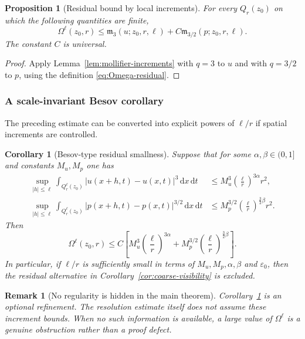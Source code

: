 \documentclass[11pt]{article}
\numberwithin{equation}{section}
\newtheorem{proposition}[theorem]{Proposition}
\newtheorem{corollary}[theorem]{Corollary}
\newtheorem{remark}[theorem]{Remark}
\newcommand{\eps}{\varepsilon}
\newcommand{\dxdt}{\,\mathrm dx\,\mathrm dt}
\begin{document}
\begin{proposition}[Residual bound by local increments]\label{prop:residual-increments}
For every $Q_r(z_0)$ on which the following quantities are finite,
\begin{equation}\label{eq:Omega-increment-bound}
\Omega^\ell(z_0,r)
\le
\mathfrak m_3(u;z_0,r,\ell)+C\mathfrak m_{3/2}(p;z_0,r,\ell).
\end{equation}
The constant $C$ is universal.
\end{proposition}

\begin{proof}
Apply Lemma~\ref{lem:mollifier-increments} with $q=3$ to $u$ and with $q=3/2$ to $p$, using the definition \eqref{eq:Omega-residual}.
\end{proof}

\subsubsection{A scale-invariant Besov corollary}

The preceding estimate can be converted into explicit powers of $\ell/r$ if spatial increments are controlled.

\begin{corollary}[Besov-type residual smallness]\label{cor:besov-residual}
Suppose that for some $\alpha,\beta\in(0,1]$ and constants $M_u,M_p$ one has
\begin{align}
\sup_{|h|\le\ell}\int_{Q_r^\ell(z_0)}|u(x+h,t)-u(x,t)|^3\dxdt
&\le M_u^3\left(\frac{\ell}{r}\right)^{3\alpha}r^2,
\label{eq:u-besov-assumption}\\
\sup_{|h|\le\ell}\int_{Q_r^\ell(z_0)}|p(x+h,t)-p(x,t)|^{3/2}\dxdt
&\le M_p^{3/2}\left(\frac{\ell}{r}\right)^{\frac32\beta}r^2.
\label{eq:p-besov-assumption}
\end{align}
Then
\begin{equation}\label{eq:besov-Omega-bound}
\Omega^\ell(z_0,r)
\le
C\left[M_u^3\left(\frac{\ell}{r}\right)^{3\alpha}
+M_p^{3/2}\left(\frac{\ell}{r}\right)^{\frac32\beta}\right].
\end{equation}
In particular, if $\ell/r$ is sufficiently small in terms of $M_u,M_p,\alpha,\beta$ and $\eps_0$, then the residual alternative in Corollary~\ref{cor:coarse-visibility} is excluded.
\end{corollary}

\begin{remark}[No regularity is hidden in the main theorem]
Corollary~\ref{cor:besov-residual} is an optional refinement.  The resolution estimate itself does not assume these increment bounds.  When no such information is available, a large value of $\Omega^\ell$ is a genuine obstruction rather than a proof defect.
\end{remark}
\end{document}
